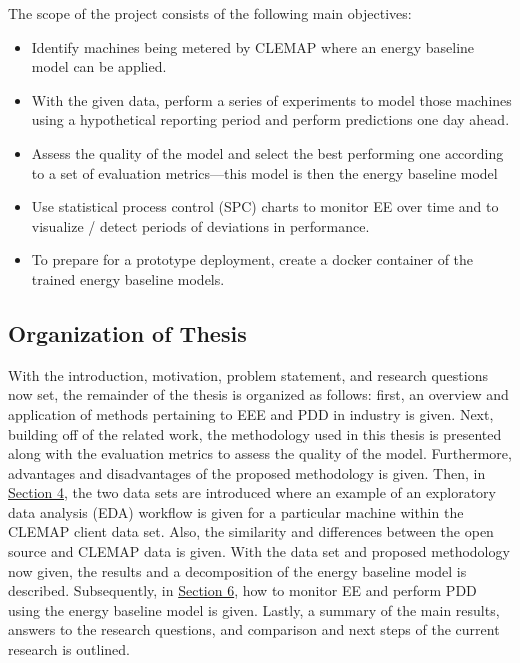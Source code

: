 The scope of the project consists of the following main objectives:

\begin{itemize}
    \item Identify machines being metered by CLEMAP where an energy baseline model can be applied.
    \item With the given data, perform a series of experiments to model those machines using a hypothetical reporting period and perform predictions one day ahead.
    \item Assess the quality of the model and select the best performing one according to a set of evaluation metrics—this model is then the energy baseline model
    \item Use statistical process control (SPC) charts to monitor EE over time and to visualize / detect periods of deviations in performance. 
    \item To prepare for a prototype deployment, create a docker container of the trained energy baseline models.
\end{itemize}

\subsection{Organization of Thesis}

With the introduction, motivation, problem statement, and research questions now set, the remainder of the thesis is organized as follows: first, an overview and application of methods pertaining to EEE and PDD in industry is given. Next, building off of the related work, the methodology used in this thesis is presented along with the evaluation metrics to assess the quality of the model. Furthermore, advantages and disadvantages of the proposed methodology is given. Then, in \hyperlink{section.4}{Section 4}, the two data sets are introduced where an example of an exploratory data analysis (EDA) workflow is given for a particular machine within the CLEMAP client data set. Also, the similarity and differences between the open source and CLEMAP data is given. With the data set and proposed methodology now given, the results and a decomposition of the energy baseline model is described. Subsequently, in \hyperlink{section.6}{Section 6}, how to monitor EE and perform PDD using the energy baseline model is given. Lastly, a summary of the main results, answers to the research questions, and comparison and next steps of the current research is outlined.